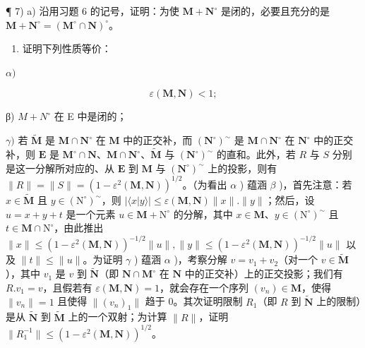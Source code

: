 ¶ 7) a) 沿用习题 6 的记号，证明：为使 \(\mathbf{M} + \mathbf{N}^{\circ}\) 是闭的，必要且充分的是 \(\mathbf{M} + \mathbf{N}^{\circ} = (\mathbf{M}^{\circ} \cap \mathbf{N})^{\circ}\)。

\begin{enumerate}
\def\labelenumi{\alph{enumi})}
\setcounter{enumi}{1}
\tightlist
\item
  证明下列性质等价：
\end{enumerate}

\(\alpha)\)

\[
\varepsilon (\mathbf {M}, \mathbf {N}) <   1;
\]

β) \(M + N^{\circ}\) 在 E 中是闭的；

\(\gamma)\) 若 \(\tilde{\mathbf{M}}\) 是 \(\mathbf{M} \cap \mathbf{N}^{\circ}\) 在 \(\mathbf{M}\) 中的正交补，而 \((\mathbf{N}^{\circ})^{\sim}\) 是 \(\mathbf{M} \cap \mathbf{N}^{\circ}\) 在 \(\mathbf{N}^{\circ}\) 中的正交补，则 \(\mathbf{E}\) 是 \(\mathbf{M}^{\circ} \cap \mathbf{N}\)、\(\mathbf{M} \cap \mathbf{N}^{\circ}\)、\(\tilde{\mathbf{M}}\) 与 \((\mathbf{N}^{\circ})^{\sim}\) 的直和。此外，若 \(R\) 与 \(S\) 分别是这一分解所对应的、从 \(\mathbf{E}\) 到 \(\mathbf{M}\) 与 \((\mathbf{N}^{\circ})^{\sim}\) 上的投影，则有 \(\| R \| = \| S \| = (1 - \varepsilon^2 (\mathbf{M}, \mathbf{N}))^{1/2}\)。（为看出 \(\alpha\) ) 蕴涵 \(\beta\) )，首先注意：若 \(x \in \tilde{\mathbf{M}}\) 且 \(y \in (\mathrm{N}^\circ)^{\sim}\)，则 \(|\langle x | y \rangle| \leqslant \varepsilon (\mathbf{M}, \mathbf{N}) \| x \| . \| y \|\)；然后，设 \(u = x + y + t\) 是一个元素 \(u \in \mathbf{M} + \mathrm{N}^\circ\) 的分解，其中 \(x \in \mathbf{M}\)、\(y \in (\mathrm{N}^\circ)^{\sim}\) 且 \(t \in \mathbf{M} \cap \mathrm{N}^\circ\)，由此推出 \(\| x \| \leqslant (1 - \varepsilon^2 (\mathbf{M}, \mathbf{N}))^{-1/2} \| u \|, \| y \| \leqslant (1 - \varepsilon^2 (\mathbf{M}, \mathbf{N}))^{-1/2} \| u \|\) 以及 \(\| t \| \leqslant \| u \|\)。为证明 \(\gamma\) ) 蕴涵 \(\alpha\) )，考察分解 \(v = v_1 + v_2\)（对一个 \(v \in \tilde{\mathbf{M}}\)），其中 \(v_1\) 是 \(v\) 到 \(\tilde{\mathbf{N}}\)（即 \(\mathbf{N} \cap \mathbf{M}^\circ\) 在 \(\mathbf{N}\) 中的正交补）上的正交投影；我们有 \(R.v_1 = v\)，且假若有 \(\varepsilon (\mathbf{M}, \mathbf{N}) = 1\)，就会存在一个序列 \((v_n) \in \mathbf{M}\)，使得 \(\| v_n \| = 1\) 且使得 \(\| (v_n)_1\|\) 趋于 0。其次证明限制 \(R_1\)（即 \(R\) 到 \(\tilde{\mathbf{N}}\) 上的限制）是从 \(\tilde{\mathbf{N}}\) 到 \(\tilde{\mathbf{M}}\) 上的一个双射；为计算 \(\| R \|\)，证明 \(\| R_1^{-1} \| \leqslant (1 - \varepsilon^2 (\mathbf{M}, \mathbf{N}))^{1/2}\)。

